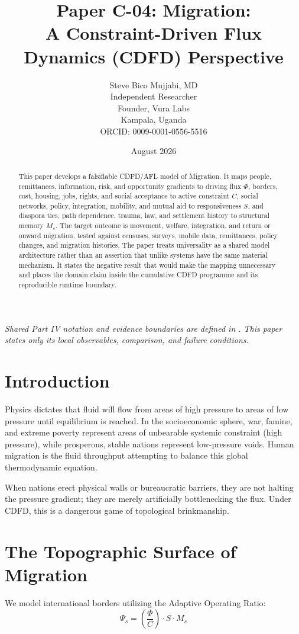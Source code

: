 \documentclass[11pt,a4paper]{article}
\title{\textbf{Paper C-04: Migration:\\ A Constraint-Driven Flux Dynamics (CDFD) Perspective}}
\author{Steve Bico Mujjabi, MD\\
\small Independent Researcher\\
\small Founder, Vura Labs\\
\small Kampala, Uganda\\
\small ORCID: 0009-0001-0556-5516}
\date{August 2026}
\begin{document}
\maketitle

\noindent\textit{Shared Part IV notation and evidence boundaries are defined in . This paper states only its local observables, comparison, and failure conditions.}


\begin{abstract}
This paper develops a falsifiable CDFD/AFL model of Migration. It maps people, remittances, information, risk, and opportunity gradients to driving flux $\Phi$, borders, cost, housing, jobs, rights, and social acceptance to active constraint $C$, social networks, policy, integration, mobility, and mutual aid to responsiveness $S$, and diaspora ties, path dependence, trauma, law, and settlement history to structural memory $M_s$. The target outcome is movement, welfare, integration, and return or onward migration, tested against censuses, surveys, mobile data, remittances, policy changes, and migration histories. The paper treats universality as a shared model architecture rather than an assertion that unlike systems have the same material mechanism. It states the negative result that would make the mapping unnecessary and places the domain claim inside the cumulative CDFD programme and its reproducible runtime boundary.
\end{abstract}

\section{Introduction}

Physics dictates that fluid will flow from areas of high pressure to areas of low pressure until equilibrium is reached. In the socioeconomic sphere, war, famine, and extreme poverty represent areas of unbearable systemic constraint (high pressure), while prosperous, stable nations represent low-pressure voids. Human migration is the fluid throughput attempting to balance this global thermodynamic equation.

When nations erect physical walls or bureaucratic barriers, they are not halting the pressure gradient; they are merely artificially bottlenecking the flux. Under CDFD, this is a dangerous game of topological brinkmanship.

\section{The Topographic Surface of Migration}
We model international borders utilizing the Adaptive Operating Ratio:
\begin{equation}
    \Psi_s = \left( \frac{\Phi}{C} \right) \cdot S \cdot M_s
\end{equation}
\end{document}
